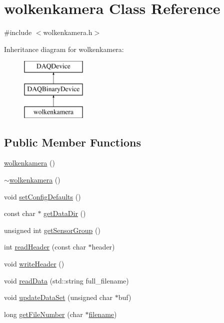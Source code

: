 \hypertarget{classwolkenkamera}{\section{wolkenkamera Class Reference}
\label{classwolkenkamera}
}


{\ttfamily \#include $<$wolkenkamera.\-h$>$}

Inheritance diagram for wolkenkamera\-:\begin{figure}[H]
\begin{center}
\leavevmode
\includegraphics[height=3.000000cm]{classwolkenkamera}
\end{center}
\end{figure}
\subsection*{Public Member Functions}
\begin{DoxyCompactItemize}
\item 
\hyperlink{classwolkenkamera_ae13f001a967338d8301ece76e9046980}{wolkenkamera} ()
\item 
\hyperlink{classwolkenkamera_a1f773650109aff935dcf89246c51da93}{$\sim$wolkenkamera} ()
\item 
void \hyperlink{classwolkenkamera_a718522b6c0780be9819af11b9e6a81dd}{set\-Config\-Defaults} ()
\item 
const char $\ast$ \hyperlink{classwolkenkamera_ac4f55fd3e4b97532af5774daab350358}{get\-Data\-Dir} ()
\item 
unsigned int \hyperlink{classwolkenkamera_abf6bb4f8fe052838bb2cf1905ce15caa}{get\-Sensor\-Group} ()
\item 
int \hyperlink{classwolkenkamera_acbca7eeed93a4686d5661c997c24ac7b}{read\-Header} (const char $\ast$header)
\item 
void \hyperlink{classwolkenkamera_ab5b110a1434326c6f843390fc91c6f1b}{write\-Header} ()
\item 
void \hyperlink{classwolkenkamera_a9d63655c35a98dec0583b27a67b292ce}{read\-Data} (std\-::string full\-\_\-filename)
\item 
void \hyperlink{classwolkenkamera_ab6cb0bfc7780ca531c10d18ff7b7ab13}{update\-Data\-Set} (unsigned char $\ast$buf)
\item 
long \hyperlink{classwolkenkamera_aada77e474f3ed7097178c17e03c78b5b}{get\-File\-Number} (char $\ast$\hyperlink{classDAQDevice_a7f9cda7cf5b41f6b134c313477e9644b}{filename})
\end{DoxyCompactItemize}
